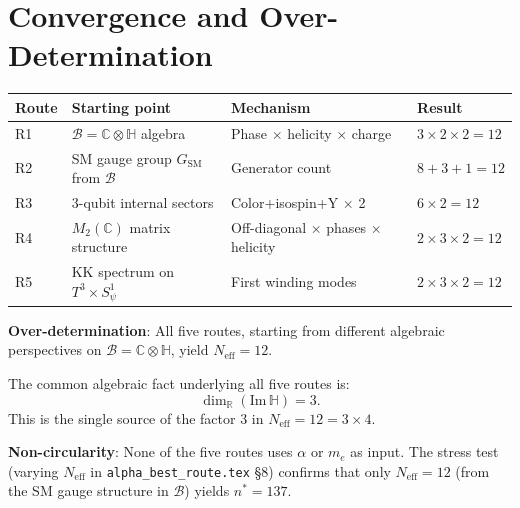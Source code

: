 \documentclass[12pt,a4paper]{article}
\theoremstyle{definition}
\theoremstyle{remark}
\begin{document}
\section{Convergence and Over-Determination}
\label{sec:neff12:convergence}

\begin{center}
\begin{tabular}{llll}
\toprule
Route & Starting point & Mechanism & Result \\
\midrule
R1 & $\mathcal{B} = \mathbb{C}\otimes\mathbb{H}$ algebra & Phase $\times$ helicity $\times$ charge & $3\times2\times2 = 12$ \\
R2 & SM gauge group $G_{\mathrm{SM}}$ from $\mathcal{B}$ & Generator count & $8+3+1 = 12$ \\
R3 & 3-qubit internal sectors & Color+isospin+Y $\times$ 2 & $6\times2 = 12$ \\
R4 & $M_2(\mathbb{C})$ matrix structure & Off-diagonal $\times$ phases $\times$ helicity & $2\times3\times2 = 12$ \\
R5 & KK spectrum on $T^3\times S^1_\psi$ & First winding modes & $2\times3\times2 = 12$ \\
\bottomrule
\end{tabular}
\end{center}

\begin{insightbox}
\textbf{Over-determination}: All five routes, starting from different algebraic
perspectives on $\mathcal{B} = \mathbb{C}\otimes\mathbb{H}$, yield $N_{\mathrm{eff}} = 12$.

The common algebraic fact underlying all five routes is:
\begin{equation}
  \dim_\mathbb{R}(\mathrm{Im}\,\mathbb{H}) = 3.
  \label{eq:neff12:common}
\end{equation}
This is the single source of the factor 3 in $N_{\mathrm{eff}} = 12 = 3 \times 4$.

\medskip
\textbf{Non-circularity}: None of the five routes uses $\alpha$ or $m_e$ as input.
The stress test (varying $N_{\mathrm{eff}}$ in \texttt{alpha\_best\_route.tex} \S8)
confirms that only $N_{\mathrm{eff}} = 12$ (from the SM gauge structure in $\mathcal{B}$)
yields $n^* = 137$.
\end{insightbox}

\end{document}
